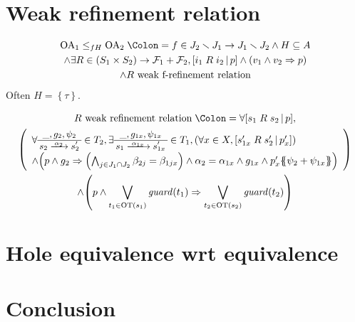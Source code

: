\documentclass{article}
\theoremstyle{plain}
\theoremstyle{definition}
\newcommand\mpar[1]{{\left(#1\right)}}
\newcommand\mbrk[1]{{\left[#1\right]}}
\newcommand\mbrc[1]{{\left\{#1\right\}}}
\newcommand\psubst[1]{\mbrc{\!\!\mbrc{#1}\!\!}}
\newcommand\midbar{\,\middle|\,}
\newcommand\prel[4]{\mbrk{#2\mathrel{#1}#3\midbar #4}}
\newcommand\defnotation{\DOTSB\;{\Colon=}\;}
\newcommand\fformulae[1]{{\mathcal{F}}}
\newcommand\OT[6]{\text{\small\(%
	\setlength\arraycolsep{2pt}\everymath{\displaystyle}%
	\begin{array}{c}%
	#4,#5,#6 \\\hline
	#1\xrightarrow{\raisebox{-1.5pt}[.8\height][0pt]{\makebox[1.4\width]{\(\scriptstyle #3\)}}}#2
	\end{array}\)}}
\begin{document}
\section{Weak refinement relation}
\begin{multline*}
	\mathrm{OA}_1 \leq_{fH} \mathrm{OA}_2 \defnotation f \in J_2 \setminus J_1 \to J_1 \setminus J_2 \wedge H \subseteq A \\
	\wedge \exists R \in \mpar{S_1 \times S_2} \to \fformulae{E}_1 + \fformulae{E}_2, \prel{R}{i_1}{i_2}{p} \wedge \mpar{v_1 \wedge v_2 \Rightarrow p} \\
	\wedge R \text{ weak f-refinement relation}
\end{multline*}
Often \(H = \mbrc{\tau}\).

\begin{multline*}
	R \text{ weak refinement relation} \defnotation \forall \prel{R}{s_1}{s_2}{p}, \\
	\mpar{\begin{array}{l}
		\forall \OT{s_2}{s'_2}{\alpha_2}{\_}{g_2}{\psi_2} \in T_2, \exists \OT{s_1}{s'_{1x}}{\alpha_{1x}}{\_}{g_{1x}}{\psi_{1x}} \in T_1, \mpar{\forall x \in X, \prel{R}{s'_{1x}}{s'_2}{p'_x}} \\
		\wedge \mpar{p \wedge g_2 \Rightarrow \mpar{\bigwedge_{j \in J_1 \cap J_2} \beta_{2j} = \beta_{1jx}} \wedge \alpha_2 = \alpha_{1x} \wedge g_{1x} \wedge p'_x\psubst{\psi_2 + \psi_{1x}}}
	\end{array}} \\
	\wedge \mpar{p \wedge \bigvee_{t_1 \in \mathrm{OT}\mpar{s_1}} \mathit{guard}\mpar{t_1} \Rightarrow \bigvee_{t_2 \in \mathrm{OT}\mpar{s_2}} \mathit{guard}\mpar{t_2}}
\end{multline*}


\section{Hole equivalence wrt equivalence}


\section{Conclusion}
\end{document}
